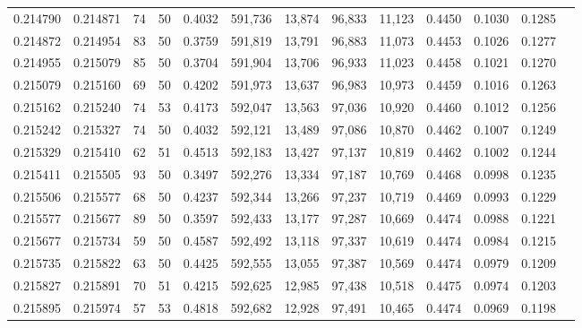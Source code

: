 \begin{tabular}{rrrrrrrrrrrrr}
0.214790 & 0.214871 &    74 &  50 &                                     0.4032 & 591,736 &  13,874 &  96,833 &  11,123 & 0.4450 & 0.1030 & 0.1285 \\
0.214872 & 0.214954 &    83 &  50 &                                     0.3759 & 591,819 &  13,791 &  96,883 &  11,073 & 0.4453 & 0.1026 & 0.1277 \\
0.214955 & 0.215079 &    85 &  50 &                                     0.3704 & 591,904 &  13,706 &  96,933 &  11,023 & 0.4458 & 0.1021 & 0.1270 \\
0.215079 & 0.215160 &    69 &  50 &                                     0.4202 & 591,973 &  13,637 &  96,983 &  10,973 & 0.4459 & 0.1016 & 0.1263 \\
0.215162 & 0.215240 &    74 &  53 &                                     0.4173 & 592,047 &  13,563 &  97,036 &  10,920 & 0.4460 & 0.1012 & 0.1256 \\
0.215242 & 0.215327 &    74 &  50 &                                     0.4032 & 592,121 &  13,489 &  97,086 &  10,870 & 0.4462 & 0.1007 & 0.1249 \\
0.215329 & 0.215410 &    62 &  51 &                                     0.4513 & 592,183 &  13,427 &  97,137 &  10,819 & 0.4462 & 0.1002 & 0.1244 \\
0.215411 & 0.215505 &    93 &  50 &                                     0.3497 & 592,276 &  13,334 &  97,187 &  10,769 & 0.4468 & 0.0998 & 0.1235 \\
0.215506 & 0.215577 &    68 &  50 &                                     0.4237 & 592,344 &  13,266 &  97,237 &  10,719 & 0.4469 & 0.0993 & 0.1229 \\
0.215577 & 0.215677 &    89 &  50 &                                     0.3597 & 592,433 &  13,177 &  97,287 &  10,669 & 0.4474 & 0.0988 & 0.1221 \\
0.215677 & 0.215734 &    59 &  50 &                                     0.4587 & 592,492 &  13,118 &  97,337 &  10,619 & 0.4474 & 0.0984 & 0.1215 \\
0.215735 & 0.215822 &    63 &  50 &                                     0.4425 & 592,555 &  13,055 &  97,387 &  10,569 & 0.4474 & 0.0979 & 0.1209 \\
0.215827 & 0.215891 &    70 &  51 &                                     0.4215 & 592,625 &  12,985 &  97,438 &  10,518 & 0.4475 & 0.0974 & 0.1203 \\
0.215895 & 0.215974 &    57 &  53 &                                     0.4818 & 592,682 &  12,928 &  97,491 &  10,465 & 0.4474 & 0.0969 & 0.1198 \\

\end{tabular}

